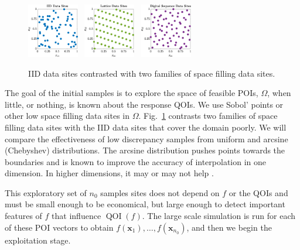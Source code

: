 \documentclass[11pt]{NSFamsart}
\DeclareMathOperator{\QOI}{QOI} %
\newcommand{\bx}{{\boldsymbol{x}}}
\begin{document}
\begin{figure} %
	\centering
	\includegraphics[width = 0.20\textwidth]{ProgramsImages/IIDPoints.eps} \ 
	\includegraphics[width = 0.20\textwidth]{ProgramsImages/ShiftedLatticePoints.eps}  \ 
	\includegraphics[width = 0.20\textwidth]{ProgramsImages/SSobolPoints.eps} 
	
	\caption{IID data sites contrasted with two families of space filling data sites.\label{PtsFig}}
\end{figure}

The goal of the initial samples is to explore the space of feasible POIs, $\Omega$,  when little, or nothing, is known about the response QOIs.  We use  Sobol' points or other low space filling data sites \cite{DicPil10a} in $\Omega$.  Fig.\ \ref{PtsFig} contrasts two families of space filling data sites with the IID data sites that cover the domain poorly. We  will compare the effectiveness of low discrepancy samples from uniform and arcsine (Chebyshev) distributions.
The arcsine distribution pushes points towards the boundaries and is known to improve the accuracy of interpolation in one dimension.  
In higher dimensions, it may or may not help \cite{HicLi12a}.

This exploratory set of $n_0$ samples sites does not depend on $f$ or the QOIs and must be small enough to be economical, but large enough to detect important features of $f$ that influence $\QOI(f)$. The large scale simulation is run for each of these POI vectors to obtain $f(\bx_1), \ldots, f(\bx_{n_0})$, and then we begin the exploitation stage.
\end{document}
